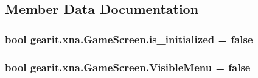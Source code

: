 \subsection{Member Data Documentation}
\hypertarget{classgearit_1_1xna_1_1_game_screen_a9650c912126ccbc4dfbe86f2b460cbad}{
\subsubsection[{is\+\_\+initialized}]{\setlength{\rightskip}{0pt plus 5cm}bool gearit.\+xna.\+Game\+Screen.\+is\+\_\+initialized = false}}\label{classgearit_1_1xna_1_1_game_screen_a9650c912126ccbc4dfbe86f2b460cbad}
\hypertarget{classgearit_1_1xna_1_1_game_screen_ab44dcd600c5f92f0de16bd20b2aba32f}{
\subsubsection[{Visible\+Menu}]{\setlength{\rightskip}{0pt plus 5cm}bool gearit.\+xna.\+Game\+Screen.\+Visible\+Menu = false}}\label{classgearit_1_1xna_1_1_game_screen_ab44dcd600c5f92f0de16bd20b2aba32f}


